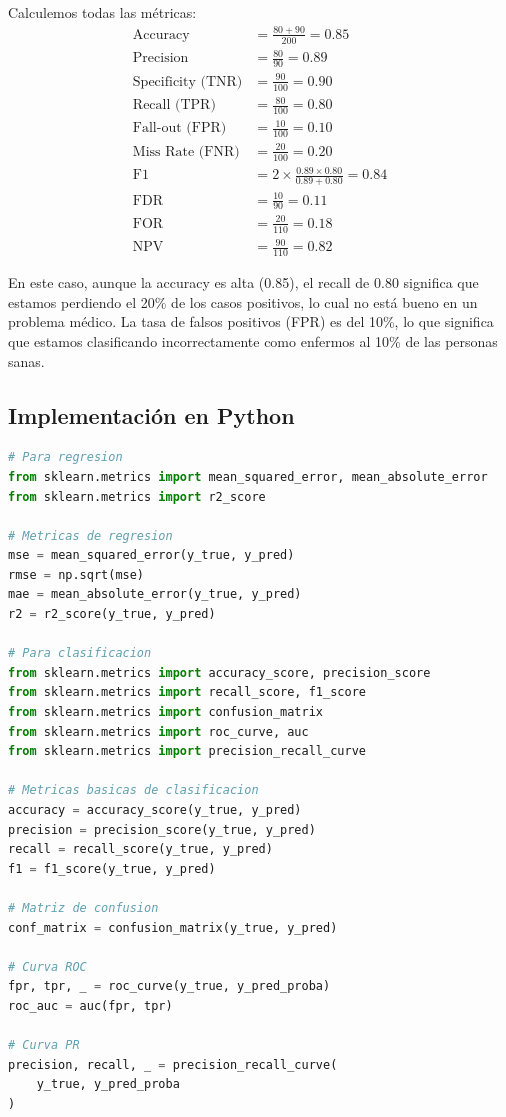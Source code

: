 \documentclass[12pt]{article}
\begin{document}
Calculemos todas las métricas:
\begin{align*}
\text{Accuracy} &= \frac{80 + 90}{200} = 0.85 \\
\text{Precision} &= \frac{80}{90} = 0.89 \\
\text{Specificity (TNR)} &= \frac{90}{100} = 0.90 \\
\text{Recall (TPR)} &= \frac{80}{100} = 0.80 \\
\text{Fall-out (FPR)} &= \frac{10}{100} = 0.10 \\
\text{Miss Rate (FNR)} &= \frac{20}{100} = 0.20 \\
\text{F1} &= 2 \times \frac{0.89 \times 0.80}{0.89 + 0.80} = 0.84 \\
\text{FDR} &= \frac{10}{90} = 0.11 \\
\text{FOR} &= \frac{20}{110} = 0.18 \\
\text{NPV} &= \frac{90}{110} = 0.82
\end{align*}

En este caso, aunque la accuracy es alta (0.85), el recall de 0.80 significa que estamos perdiendo el 20\% de los casos positivos, lo cual no está bueno en un problema médico. La tasa de falsos positivos (FPR) es del 10\%, lo que significa que estamos clasificando incorrectamente como enfermos al 10\% de las personas sanas.

\subsection{Implementación en Python}

\begin{lstlisting}[language=Python]
# Para regresion
from sklearn.metrics import mean_squared_error, mean_absolute_error
from sklearn.metrics import r2_score

# Metricas de regresion
mse = mean_squared_error(y_true, y_pred)
rmse = np.sqrt(mse)
mae = mean_absolute_error(y_true, y_pred)
r2 = r2_score(y_true, y_pred)

# Para clasificacion
from sklearn.metrics import accuracy_score, precision_score
from sklearn.metrics import recall_score, f1_score
from sklearn.metrics import confusion_matrix
from sklearn.metrics import roc_curve, auc
from sklearn.metrics import precision_recall_curve

# Metricas basicas de clasificacion
accuracy = accuracy_score(y_true, y_pred)
precision = precision_score(y_true, y_pred)
recall = recall_score(y_true, y_pred)
f1 = f1_score(y_true, y_pred)

# Matriz de confusion
conf_matrix = confusion_matrix(y_true, y_pred)

# Curva ROC
fpr, tpr, _ = roc_curve(y_true, y_pred_proba)
roc_auc = auc(fpr, tpr)

# Curva PR
precision, recall, _ = precision_recall_curve(
    y_true, y_pred_proba
)
\end{lstlisting}
\end{document}

